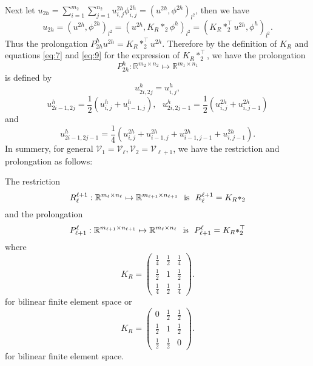 Next 
let $u_{2h}=\sum\limits_{i=1}^{m_2}\sum\limits_{j=1}^{n_2}u_{i,j}^{2h}\phi^{2h}_{i,j}=( u^{2h}, \phi^{2h})_{l^2}$, then we have
\begin{equation}
u_{2h}=( u^{2h}, \phi^{2h})_{l^2}
=( u^{2h}, K_R\ast_2\phi^{h})_{l^2}=(K_R\ast_2^{\top} u^{2h}, \phi^{h})_{l^2}.
\end{equation}
Thus the prolongation $P_{2h}^h u^{2h}=K_R\ast_2^{\top} u^{2h}$. Therefore by the definition of $K_R$ and equations 
\eqref{eq:7} and \eqref{eq:9} for the expression of $K_R\ast_2^{\top}$, we have 
 the prolongation 
$$
P_{2h}^h: \mathbb R^{m_{2}\times n_{2}}\mapsto  \mathbb R^{m_{1}\times n_{1} }
$$
is defined by 
$$
u^h_{2i,2j}=u^h_{i,j},
$$
$$
u^h_{2i-1,2j}=\frac{1}{2}(u^h_{i,j}+u^h_{i-1,j}),~~~ u^h_{2i,2j-1}=\frac{1}{2}(u^{2h}_{i,j}+u^{2h}_{i,j-1})
$$
and 
$$
u^h_{2i-1,2j-1}=\frac{1}{4}(u^{2h}_{i,j}+u^{2h}_{i-1,j}+u^{2h}_{i-1,j-1}+u^{2h}_{i,j-1}).
$$
In summery, for general $\mathcal V_1=\mathcal  V_\ell,  \mathcal V_2=\mathcal  V_{\ell+1}$, we have the restriction and prolongation
as follows: 
\begin{lemma}\label{ris:plon}
The restriction 
$$
R^{\ell+1}_\ell: \mathbb R^{m_\ell\times n_\ell}\mapsto  \mathbb R^{m_{\ell+1}\times n_{\ell+1}}~~\hbox{is}~~ R^{\ell+1}_\ell = K_R\ast_2  
$$ 
and the prolongation
$$
P_{\ell+1}^{\ell}: \mathbb R^{m_{\ell+1}\times n_{\ell+1}}\mapsto  \mathbb R^{m_{\ell}\times n_{\ell} } ~~\hbox{is}~~ P^{\ell}_{\ell+1} =K_R\ast_2^{\top} 
$$
where 
\begin{equation}\label{bi-restrict}
	K_R=
	\begin{pmatrix}
	\frac{1}{4} &\frac{1}{2}&\frac{1}{4}\\
	\frac{1}{2}& 1&\frac{1}{2}\\
	\frac{1}{4}&\frac{1}{2}&  \frac{1}{4} 
	\end{pmatrix}.
	\end{equation}
	for bilinear finite element space or 
\begin{equation}\label{li-restrict}
	K_R=
	\begin{pmatrix}
	0&\frac{1}{2}&\frac{1}{2}\\
	\frac{1}{2}& 1&\frac{1}{2}\\
	 \frac{1}{2} &\frac{1}{2}& 0
	\end{pmatrix}.
	\end{equation}	
for bilinear finite element space.	
\end{lemma}





	
	

